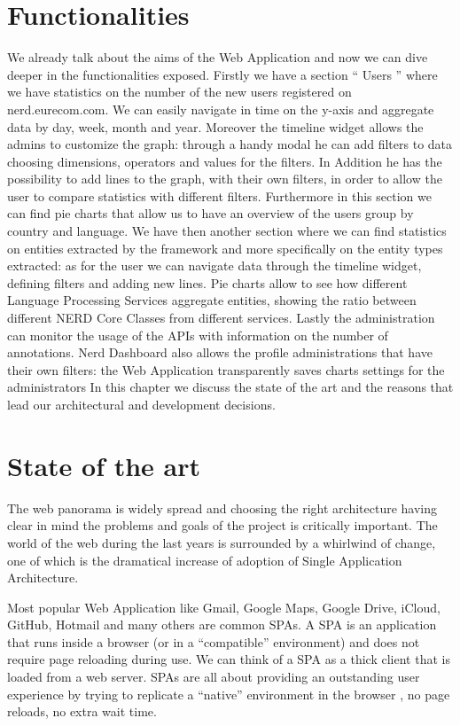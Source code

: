 \documentclass[a4paper,13pt]{report}
\begin{document}
\section{Functionalities}
    We already talk about the aims of the Web Application and now we can dive deeper in the functionalities exposed.
    Firstly we have a section `` Users '' where we have statistics on the number of the new users registered on nerd.eurecom.com. We can easily navigate in time on the y-axis and aggregate data by day, week, month and year. Moreover the timeline widget allows the admins to customize the graph: through a handy modal he can add filters to data choosing dimensions, operators and values for the filters. In Addition he has the possibility to add lines to the graph, with their own filters, in order to allow the user to compare statistics with different filters.
    Furthermore in this section we can find pie charts that allow us to have an overview of the users group by country and language.
    We have then another section where we can find statistics on entities extracted by the framework and more specifically on the entity types extracted: as for the user we can navigate data through the timeline widget, defining filters and adding new lines. Pie charts allow to see how different Language Processing Services aggregate entities, showing the ratio between different NERD Core Classes from different services.
    Lastly the administration can monitor the usage of the APIs with information on the number of annotations.
    Nerd Dashboard also allows the profile administrations that have their own filters: the Web Application transparently saves charts settings for the administrators
   In this chapter we discuss the state of the art and the reasons that lead our architectural and development decisions.

\section{State of the art}
The web panorama is widely spread and choosing the right architecture having clear in mind the problems and goals of the project is critically important. 
The world of the web during the last years is surrounded by a whirlwind of change, one of which is the dramatical increase of adoption of Single Application Architecture.\newline

Most popular Web Application like Gmail, Google Maps, Google Drive, iCloud, GitHub, Hotmail and many others are common SPAs.
A SPA is an application that runs inside a browser (or in a ``compatible'' environment) and does not require page reloading during use. We can think of a SPA as a thick client that is loaded from a web server. 
SPAs are all about providing an outstanding user experience by trying to replicate a ``native'' environment in the browser , no page reloads, no extra wait time.
\end{document}
